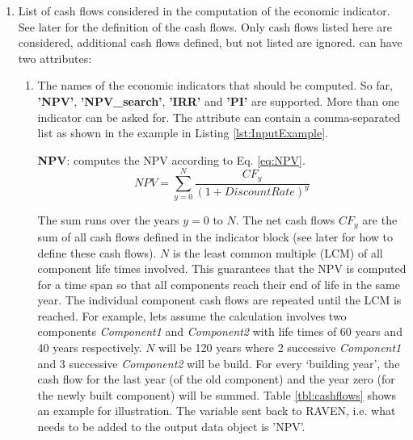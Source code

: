 \begin{enumerate}
\item[\xmlNode{Indicator}] List of cash flows considered in the computation of the economic indicator. See later for the definition
 of the cash flows. Only cash flows listed here are considered, additional cash flows defined, but not listed are ignored. 
 can have two attributes:
  \begin{enumerate}
  \item[\xmlAttr{name}] The names of the economic indicators that should be computed. So far, \textbf{'NPV'}, \textbf{'NPV\_search'}, \textbf{'IRR'} and \textbf{'PI'} are supported. More than one indicator can be asked for. 
The  attribute can contain a comma-separated list as shown in the example in Listing \ref{lst:InputExample}.

\textbf{NPV}: computes the NPV according to Eq. \ref{eq:NPV}.
\begin{equation}\label{eq:NPV}
NPV=\sum_{y=0}^{N}\frac{CF_{y}}{(1+DiscountRate)^{y}}
\end{equation}

The sum runs over the years $y=0$ to $N$. The net cash flows $CF_{y}$ are the sum of all cash flows defined in the indicator block (see later for how to define these cash flows). 
$N$ is the least common multiple (LCM) of all component life times involved. This guarantees that the NPV is computed for a time span so that all components reach their end of life in the same year. 
The individual component cash flows are repeated until the LCM is reached. For example, lets assume the calculation involves two components \textit{Component1} and \textit{Component2}
 with life times of 60 years and 40 years respectively. $N$ will be 120 years where 2 successive \textit{Component1} and 3 successive \textit{Component2} will be build. For every ‘building year’, 
the cash flow for the last year (of the old component) and the year zero (for the newly built component) will be summed. Table \ref{tbl:cashflows} shows an example for illustration.
The variable sent back to RAVEN, i.e. what needs to be added to the output data object is 'NPV'.


\end{enumerate}
\end{enumerate}
